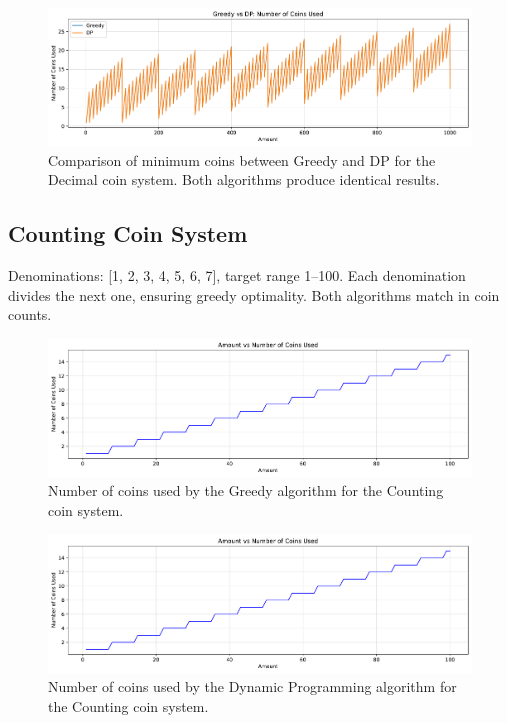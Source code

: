 \documentclass[12pt,a4paper]{report}
\begin{document}
\begin{figure}[H]
  \centering
  \includegraphics[width=\textwidth]{graphs/compare_coins_decimal_plot.pdf}
  \caption{Comparison of minimum coins between Greedy and DP for the Decimal coin system. Both algorithms produce identical results.}
  \label{fig:compare_coins_decimal}
\end{figure}

\subsection{Counting Coin System}
Denominations: [1, 2, 3, 4, 5, 6, 7], target range 1--100. Each denomination divides the next one, ensuring greedy optimality. Both algorithms match in coin counts.

\begin{figure}[H]
  \centering
  \includegraphics[width=\textwidth]{graphs/greedy_coins_counting_plot.pdf}
  \caption{Number of coins used by the Greedy algorithm for the Counting coin system.}
  \label{fig:greedy_coins_counting}
\end{figure}

\begin{figure}[H]
  \centering
  \includegraphics[width=\textwidth]{graphs/dp_coins_counting_plot.pdf}
  \caption{Number of coins used by the Dynamic Programming algorithm for the Counting coin system.}
  \label{fig:dp_coins_counting}
\end{figure}
\end{document}
